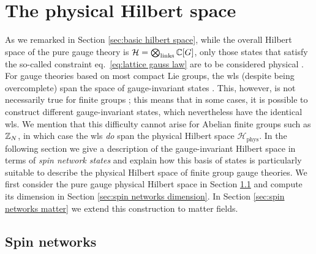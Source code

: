 \section{The physical Hilbert space}\label{sec:physical Hilbert space}

As we remarked in Section \ref{sec:basic hilbert space}, while the overall Hilbert space of the pure gauge theory is $\mathcal{H} = \bigotimes_{\mathrm{links}} \mathbb{C}[G]$, only those states that satisfy the so-called  constraint eq.~\eqref{eq:lattice gauss law} are to be considered physical \cite{KogSuss, Osborne, Tong}.
For gauge theories based on most compact Lie groups, the \ac{wl}s (despite being overcomplete) span the space of gauge-invariant states \cite{Sengupta, Durhuus}.
This, however, is not necessarily true for finite groups \cite{Sengupta, Cui}; this means that in some cases, it is possible to construct different gauge-invariant states, which nevertheless have the identical \ac{wl}s.
We mention that this difficulty cannot arise for Abelian finite groups such as $\mathbb{Z}_N$, in which case the \ac{wl}s \textit{do} span the physical Hilbert space $\mathcal{H}_{\mathrm{phys}}$.
In the following section we give a description of the gauge-invariant Hilbert space in terms of \textit{spin network states} and explain how this basis of states is particularly suitable to describe the physical Hilbert space of finite group gauge theories.
We first consider the pure gauge physical Hilbert space in Section \ref{sec:spin networks pure gauge} and compute its dimension in Section \ref{sec:spin networks dimension}.
In Section \ref{sec:spin networks matter} we extend this construction to matter fields.

\subsection{Spin networks}\label{sec:spin networks pure gauge}

